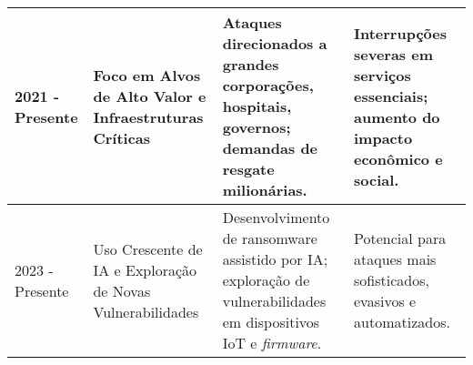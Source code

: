 \begin{table}[H]
\begin{tabularx}{\textwidth}{|l|p{3cm}|p{5cm}|p{5cm}|}
        2021 - Presente & Foco em Alvos de Alto Valor e Infraestruturas Críticas & Ataques direcionados a grandes corporações, hospitais, governos; demandas de resgate milionárias. & Interrupções severas em serviços essenciais; aumento do impacto econômico e social. \cite{CyberMaxxRansomwareHistory, Robb2024RansomwareHistory} \\ \hline
        2023 - Presente & Uso Crescente de IA e Exploração de Novas Vulnerabilidades & Desenvolvimento de ransomware assistido por IA; exploração de vulnerabilidades em dispositivos IoT e \textit{firmware}. & Potencial para ataques mais sofisticados, evasivos e automatizados. \cite{ENISA_ETL_2023, KasperskyRansomwareReport2025} \\ \hline
    \end{tabularx}
\end{table}